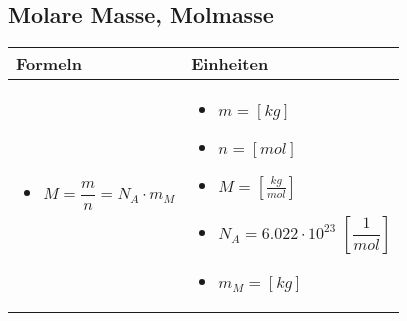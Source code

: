 \subsection{Molare Masse, Molmasse}				%
	\begin{tabular}{ | m{9cm} | m{9cm}  | }
		\hline
		Formeln & Einheiten \\ \hline
		\hline
		\begin{itemize}
			\item $M=\dfrac{m}{n}=N_{A}\cdot m_M$
			
			
		\end{itemize}
		&
		\begin{itemize}
			\item $m=[kg]$
			\item $n=[mol]$
			\item $M=[\frac{kg}{mol}]$
			\item $N_{A}=6.022\cdot 10^{23}$ $[\dfrac{1}{mol}] $
			\item $m_M=[kg]$
			
		\end{itemize}
		\\ \hline
	\end{tabular}

